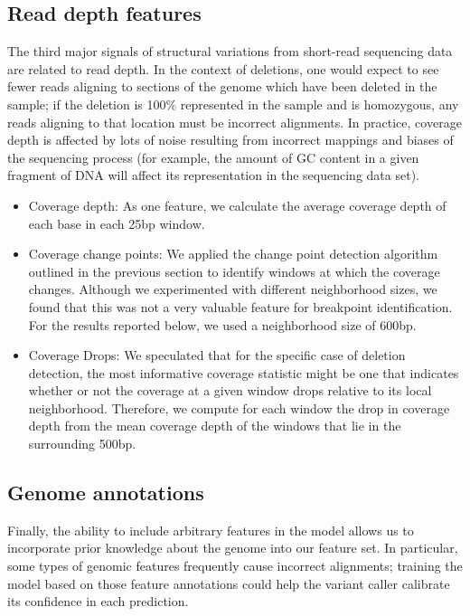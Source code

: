 \subsection{Read depth features}

The third major signals of structural variations from short-read sequencing data are related to read depth. In the context of deletions, one would expect to see fewer reads aligning to sections of the genome which have been deleted in the sample; if the deletion is 100\% represented in the sample and is homozygous, any reads aligning to that location must be incorrect alignments. In practice, coverage depth is affected by lots of noise resulting from incorrect mappings and biases of the sequencing process (for example, the amount of GC content in a given fragment of DNA will affect its representation in the sequencing data set). 

\begin{itemize}
\item Coverage depth: As one feature, we calculate the average coverage depth of each base in each 25bp window.

\item Coverage change points: We applied the change point detection algorithm outlined in the previous section to identify windows at which the coverage changes. Although we experimented with different neighborhood sizes, we found that this was not a very valuable feature for breakpoint identification. For the results reported below, we used a neighborhood size of 600bp.

\item Coverage Drops: We speculated that for the specific case of deletion detection, the most informative coverage statistic might be one that indicates whether or not the coverage at a given window drops relative to its local neighborhood. Therefore, we compute for each window the drop in coverage depth from the mean coverage depth of the windows that lie in the surrounding 500bp.
\end{itemize}

\subsection{Genome annotations}

Finally, the ability to include arbitrary features in the model allows us to incorporate prior knowledge about the genome into our feature set. In particular, some types of genomic features frequently cause incorrect alignments; training the model based on those feature annotations could help the variant caller calibrate its confidence in each prediction.

